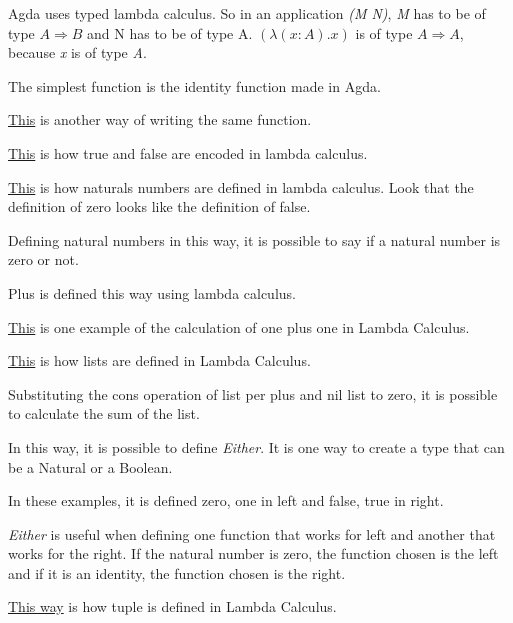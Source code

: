   Agda uses typed lambda calculus.
  So in an application \emph{(M N)}, \emph{M} has to be of type $A \Rightarrow B$ and N has to be of type A.
  $(\lambda (x : A) . x)$ is of type $A \Rightarrow A$, because \emph{x} is of type \emph{A}.

  The simplest function is the identity function made in Agda.

  \hyperref[id2]{This} is another way of writing the same function.

  \hyperref[truefalse]{This} is how true and false are encoded in lambda calculus.

  \hyperref[naturals]{This} is how naturals numbers are defined in lambda calculus.
  Look that the definition of zero looks like the definition of false.

  Defining natural numbers in this way, it is possible to say if a natural number is zero or not.

  Plus is defined this way using lambda calculus.

  \hyperref[onepone]{This} is one example of the calculation of one plus one in Lambda Calculus.

  \hyperref[list]{This} is how lists are defined in Lambda Calculus.

  Substituting the cons operation of list per plus and nil list to zero, it is possible to calculate
  the sum of the list.

  In this way, it is possible to define \emph{Either}.
  It is one way to create a type that can be a Natural or a Boolean.

  In these examples, it is defined zero, one in left and false, true in right.

  \emph{Either} is useful when defining one function that works for left and another that works for the right.
  If the natural number is zero, the function chosen is the left and
  if it is an identity, the function chosen is the right. 

  \hyperref[tuple]{This way} is how tuple is defined in Lambda Calculus.

